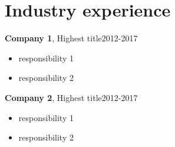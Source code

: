 
\section*{Industry experience}

\textbf{Company 1}, Highest title\hfill 2012-2017
\begin{itemize}
  \item{responsibility 1}
  \item{responsibility 2}
\end{itemize}
\textbf{Company 2}, Highest title\hfill 2012-2017
\begin{itemize}
  \item{responsibility 1}
  \item{responsibility 2}
\end{itemize}
